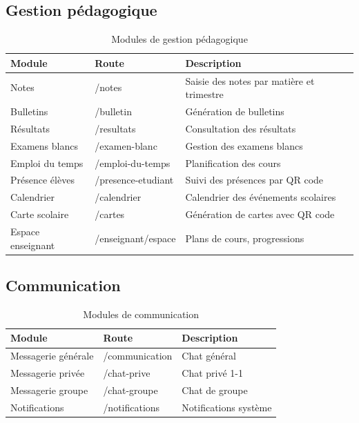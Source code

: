 \documentclass[12pt,a4paper,twoside]{report}
\begin{document}
\subsection{Gestion pédagogique}

\begin{table}[h]
\centering
\caption{Modules de gestion pédagogique}
\begin{tabular}{lll}
\toprule
Module & Route & Description \\
\midrule
Notes & /notes & Saisie des notes par matière et trimestre \\
Bulletins & /bulletin & Génération de bulletins \\
Résultats & /resultats & Consultation des résultats \\
Examens blancs & /examen-blanc & Gestion des examens blancs \\
Emploi du temps & /emploi-du-temps & Planification des cours \\
Présence élèves & /presence-etudiant & Suivi des présences par QR code \\
Calendrier & /calendrier & Calendrier des événements scolaires \\
Carte scolaire & /cartes & Génération de cartes avec QR code \\
Espace enseignant & /enseignant/espace & Plans de cours, progressions \\
\bottomrule
\end{tabular}
\end{table}

\subsection{Communication}

\begin{table}[h]
\centering
\caption{Modules de communication}
\begin{tabular}{lll}
\toprule
Module & Route & Description \\
\midrule
Messagerie générale & /communication & Chat général \\
Messagerie privée & /chat-prive & Chat privé 1-1 \\
Messagerie groupe & /chat-groupe & Chat de groupe \\
Notifications & /notifications & Notifications système \\
\bottomrule
\end{tabular}
\end{table}
\end{document}
